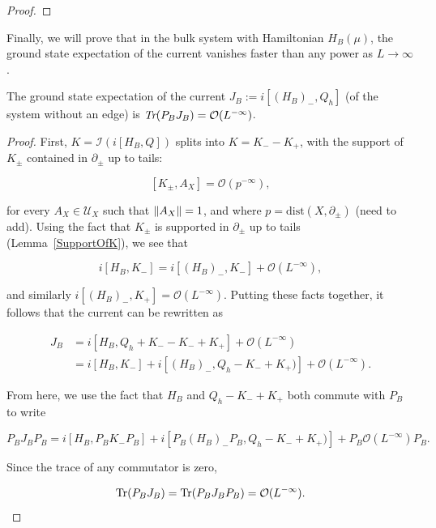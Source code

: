 \documentclass[12pt, letterpaper]{article}
\begin{document}
\begin{proof}






\end{proof}

Finally, we will prove that in the bulk system with Hamiltonian $H_B(\mu)$, the ground state expectation of the current vanishes faster than any power as $L \to \infty$.

\begin{lemma}
The ground state expectation of the current $J_B := i[(H_B)_-, Q_h]$ (of the system without an edge) is $\emph{Tr}(P_BJ_B)=\mathcal{O}(L^{-\infty})$.
\label{J=0Bulk}
\end{lemma}
\begin{proof}
First, $K = \mathcal{I}(i[H_B, Q])$ splits into $K = K_- - K_+$, with the support of $K_\pm$ contained in $\partial_\pm$ up to tails:

\[[K_\pm, A_X] = \mathcal{O}(p^{-\infty}),\]

for every $A_X \in \mathcal{U}_X$ such that $\lVert A_X \rVert=1$, and where $p = \text{dist}(X, \partial_\pm)$ (need to add). Using the fact that $K_\pm$ is supported in $\partial_\pm$ up to tails (Lemma~\ref{SupportOfK}), we see that 

\[i[H_B, K_-] = i[(H_B)_-, K_-] + \mathcal{O}(L^{-\infty}),\]

and similarly $i[(H_B)_-, K_+] = \mathcal{O}(L^{-\infty})$. Putting these facts together, it follows that the current can be rewritten as 

\[\begin{aligned} 
J _B&= i[H_B, Q_h + K_- - K_- + K_+] + \mathcal{O}(L^{-\infty})\\
&= i[H_B, K_-] + i[(H_B)_-, Q_h - K_- + K_+)] + \mathcal{O}(L^{-\infty}).
\end{aligned}\]

From here, we use the fact that $H_B$ and $Q_h-K_-+K_+$ both commute with $P_B$ to write

\[P_BJ_BP_B = i[H_B, P_BK_-P_B] + i[P_B(H_B)_-P_B, Q_h - K_- + K_+)] + P_B\mathcal{O}(L^{-\infty})P_B.\]

Since the trace of any commutator is zero, 

\[\text{Tr}(P_BJ_B) = \text{Tr}(P_BJ_BP_B) = \mathcal{O}(L^{-\infty}).\]

\end{proof}
\end{document}
